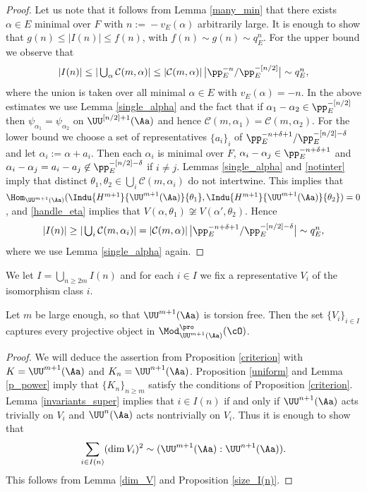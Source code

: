 \begin{proof} Let us note that it follows from Lemma \ref{many_min} that there exists $\alpha\!\in\!E$ minimal over $F$ with $n\!:=\!-v_E(\alpha)$ arbitrarily large.
It is enough to show that \hbox{$g(n)\!\le\!| I(n)|\!\le\!f(n)$}, with $f(n)\sim g(n) \sim q_E^n$. For the upper bound we observe that
\[\textstyle
| I(n)| \le |\bigcup_{\alpha} \mathcal C(m, \alpha)| \le |\mathcal C(m, \alpha)|\, \bigl| \pp_E^{-n}/ \pp_E^{-[n/2]}\bigr| \sim q_E^n,
\]
where the union is taken over all minimal $\alpha\in E$ with $v_E(\alpha)=-n$. In the above estimates we use Lemma \ref{single_alpha} and
the fact that if $\alpha_1-\alpha_2\in \pp_E^{-[n/2]}$ then $\psi_{\alpha_1}=\psi_{\alpha_2}$ on $\UU^{[n/2]+1}(\Aa)$ and hence $\mathcal C(m, \alpha_1)=\mathcal C(m, \alpha_2)$.
For the lower bound we choose a set of representatives $\{a_i\}_i$ of $\pp_E^{-n+\delta+1}/\pp_E^{-[n/2]-\delta}$ and let $\alpha_i:= \alpha+a_i$. Then each $\alpha_i$ is minimal over $F$,
$\alpha_i - \alpha_j \in \pp_E^{-n +\delta+1}$ and $\alpha_i -\alpha_j= a_i-a_j\not \in \pp_E^{-[n/2]-\delta}$ if $i\neq j$. Lemmas \ref{single_alpha} and \ref{notinter} imply that
distinct $\theta_1, \theta_2\in \bigcup_i \mathcal C(m, \alpha_i)$ do not intertwine. This implies that $\Hom_{\UU^{m+1}(\Aa)}(\Indu{H^{m+1}}{\UU^{m+1}(\Aa)}{\theta_1},
\Indu{H^{m+1}}{\UU^{m+1}(\Aa)}{\theta_2})=0$, and \eqref{handle_eta} implies that
$V(\alpha, \theta_1)\not\cong V(\alpha', \theta_2)$. Hence
\[\textstyle
|I(n)|\ge |\bigcup_i \mathcal C(m, \alpha_i)|= |\mathcal C(m, \alpha)|\, \bigl| \pp_E^{-n+\delta+1}/\pp_E^{-[n/2]-\delta}\bigr|\sim q_E^n,
\]
where we use Lemma \ref{single_alpha} again.
\end{proof}

We let $I=\bigcup_{n\ge 2m} I(n)$ and for each $i\in I$ we fix a representative $V_i$ of the isomorphism class $i$.

\begin{prop}\label{capture_super} Let $m$ be large enough, so that $\UU^{m+1}(\Aa)$ is torsion free. Then the set $\{V_i\}_{i\in I}$ captures every projective object in $\Mod^{\pro}_{\UU^{m+1}(\Aa)}(\cO)$.
\end{prop}

\begin{proof} We will deduce the assertion from Proposition \ref{criterion} with $K=\UU^{m+1}(\Aa)$ and $K_n=\UU^{n+1}(\Aa)$. Proposition \ref{uniform} and Lemma \ref{p_power} imply that
$\{K_n\}_{n\ge m}$ satisfy the conditions of Proposition \ref{criterion}. Lemma \ref{invariants_super} implies that $i\in I(n)$ if and only if $\UU^{n+1}(\Aa)$ acts trivially on $V_i$ and
$\UU^n(\Aa)$ acts nontrivially on $V_i$. Thus it is enough to show that
\[
\sum_{i\in I(n)} (\dim V_i)^2 \sim (\UU^{m+1}(\Aa): \UU^{n+1}(\Aa)).
\]
This follows from Lemma \ref{dim_V} and Proposition \ref{size_I(n)}.
\end{proof}

